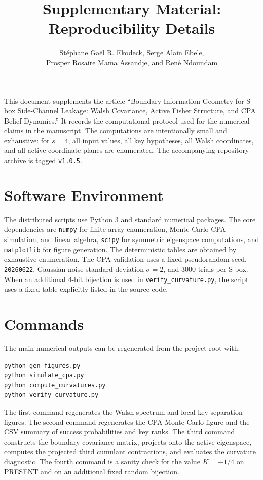 \documentclass[11pt,a4paper]{article}
\title{Supplementary Material: Reproducibility Details}
\author{St\'ephane Ga\"el R. Ekodeck, Serge Alain Ebele,\\
Prosper Rosaire Mama Assandje, and Ren\'e Ndoundam}
\date{}
\begin{document}
\maketitle

\noindent
This document supplements the article ``Boundary Information Geometry for
S-box Side-Channel Leakage: Walsh Covariance, Active Fisher Structure, and CPA
Belief Dynamics.''  It records the computational protocol used for the
numerical claims in the manuscript.  The computations are intentionally small
and exhaustive: for $s=4$, all input values, all key hypotheses, all
Walsh coordinates, and all active coordinate planes are enumerated.
The accompanying repository archive is tagged \texttt{v1.0.5}.

\section{Software Environment}

The distributed scripts use Python 3 and standard numerical packages.  The core
dependencies are \texttt{numpy} for finite-array enumeration, Monte Carlo CPA
simulation, and linear algebra, \texttt{scipy} for symmetric eigenspace
computations, and \texttt{matplotlib} for figure generation.  The deterministic
tables are obtained by exhaustive enumeration.  The CPA validation uses a
fixed pseudorandom seed, \texttt{20260622}, Gaussian noise standard deviation
\(\sigma=2\), and \(3000\) trials per S-box.  When an additional 4-bit
bijection is used in \texttt{verify\_curvature.py}, the script uses a fixed
table explicitly listed in the source code.

\section{Commands}

The main numerical outputs can be regenerated from the project root with:
\begin{verbatim}
python gen_figures.py
python simulate_cpa.py
python compute_curvatures.py
python verify_curvature.py
\end{verbatim}

\noindent
The first command regenerates the Walsh-spectrum and local key-separation
figures.  The second command regenerates the CPA Monte Carlo figure and the
CSV summary of success probabilities and key ranks.  The third command
constructs the boundary covariance matrix,
projects onto the active eigenspace, computes the projected third cumulant
contractions, and evaluates the curvature diagnostic.  The fourth command is a
sanity check for the value $K=-1/4$ on PRESENT and on an additional fixed
random bijection.
\end{document}
